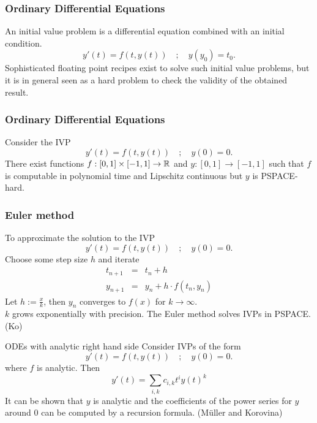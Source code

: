 \begin{frame}[<+->]
\frametitle{Ordinary Differential Equations}
An initial value problem is a differential equation combined with an initial 
condition.
$$
y'(t)=f(t,y(t)) \quad;\quad y(y_0)=t_0.
$$
\pause
Sophisticated floating point recipes exist to solve such initial value problems, but it is in general seen as a 
hard problem to check the validity of the obtained result.
\end{frame}
\begin{frame}
\frametitle{Ordinary Differential Equations}
\begin{theorem}[Kawamura, 2010]
Consider the IVP
$$
y'(t)=f(t,y(t)) \quad;\quad y(0)=0.
$$
\pause
There exist functions $f: [0,1] \times [-1,1] \to \mathbb{R}$ and $y: [0,1] \to [-1,1]$
such that $f$ is computable in polynomial time and Lipschitz continuous
but $y$ is PSPACE-hard.
\end{theorem}
\end{frame}
\begin{frame}
\frametitle{Euler method}
To approximate the solution to the IVP
$$
y'(t)=f(t,y(t)) \quad;\quad y(0)=0.
$$
Choose some step size $h$ and iterate 
\begin{eqnarray*}
t_{n+1} &=& t_n+h \\
y_{n+1} &=& y_n + h\cdot f(t_n, y_n) 
\end{eqnarray*}
Let $h := \frac{x}{k}$, then $y_n$ converges to $f(x)$ for $k \to \infty$.\\
\pause
$k$ grows exponentially with precision. The Euler method solves IVPs in PSPACE. (Ko)
\end{frame}
\begin{frame}[t]{ODEs with analytic right hand side}
 Consider IVPs of the form 
$$
y'(t)=f(t,y(t)) \quad;\quad y(0)=0.
$$
where $f$ is analytic.
Then 
$$
y'(t)=\sum_{i,k} c_{i,k}t^iy(t)^k
$$
It can be shown that $y$ is analytic and the coefficients of the power series for $y$ around $0$ can be computed by a recursion formula. (M\"{u}ller and Korovina)
\end{frame}
